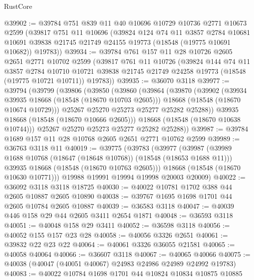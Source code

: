 \begin{lexlean}{RustCore}
\begin{coremodule}
@39902 := @39784
    @751
    @839
    @11
    @40
    @10696
    @10729
    @10736
    @2771
    @10673
    @2599
    (@39817
      @751
      @11
      @10696
      (@39824
        @124
        @74
        @11
        @3857
        @2784
        @10681
        @10691
        @39838
        @21745
        @21749
        @24155
        @19773
        (@18548 (@19775 @10691 @10682))
        @19783))
@39934 := @39784
    @761
    @157
    @11
    @28
    @10726
    @2605
    @2651
    @2771
    @10702
    @2599
    (@39817
      @761
      @11
      @10726
      (@39824
        @144
        @74
        @11
        @3857
        @2784
        @10710
        @10721
        @39838
        @21745
        @21749
        @24258
        @19773
        (@18548 (@19775 @10721 @10711))
        @19783))
@39935 := @36070 @3118
@39977 := @39794
    (@39799
      (@39806
        (@39850
          (@39860
            (@39864
              (@39870
                (@39902
                  (@39934 @39935 @18668 (@18548 (@18670 @10703 @2605)))
                  @18668
                  (@18548 (@18670 @10674 @10729)))
                @25267
                @25270
                @25273
                @25277
                @25282
                @25288))
            @39935
            @18668
            (@18548 (@18670 @10666 @2605)))
          @18668
          (@18548 (@18670 @10638 @10744)))
        @25267
        @25270
        @25273
        @25277
        @25282
        @25288))
@39987 := @39784 @1689 @157 @11 @28 @10768 @2605 @2651 @2771 @10762 @2599
@39989 := @36763 @3118 @11
@40019 := @39775
    (@39783
      (@39977
        (@39987
          (@39989 @1688 @10768 (@18647 (@18648 @10768)) (@18548 (@18653 @1688 @11)))
          @39935
          @18668
          (@18548 (@18670 @10763 @2605)))
        @18668
        (@18548 (@18670 @10630 @10771)))
      @19988
      @19991
      @19994
      @19998
      @20003
      @20009)
@40022 := @36092 @3118 @3118 @18725
@40030 := @40022 @10781 @1702 @388 @44 @2605 @10887 @2605 @10890
@40038 := @39767 @1695 @1698 @1701 @44 @2605 @10784 @2605 @10887
@40039 := @36583 @3118
@40047 := @40039 @446 @158 @29 @44 @2605 @3411 @2654 @1871
@40048 := @36593 @3118
@40051 := @40048 @158 @29 @3411
@40052 := @36598 @3118
@40056 := @40052 @155 @157 @23 @28
@40058 := @40056 @3326 @2651
@40061 := @39832 @22 @23 @22
@40064 := @40061 @3326 @36055 @21581
@40065 := @40058 @40064
@40066 := @36607 @3118
@40067 := @40065 @40066
@40075 := @40038 (@40047 (@40051 @40067) @24983 @24986 @24989 @24992 @19783)
@40083 := @40022 @10784 @1698 @1701 @44 @10824 @10834 @10875 @10885

\end{coremodule}
\end{lexlean}
